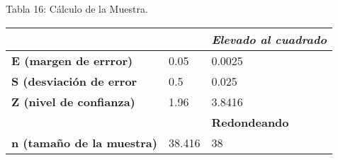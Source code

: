                 \begin{table}[h!]
                    \centering
                    { Tabla 16: Cálculo de la Muestra.}\par
                    \begin{tabular}{|p{5cm}|p{3cm}|p{5cm}|} \hline
                        
                    
                    \textit{{}} &
                    \textit{{}} &
                    \textit{{\bf{Elevado al cuadrado}}} 
                    \\ \hline
    
                    {\bf E (margen de errror)} &
                    0.05 &
                    0.0025
                    \\ \hline

                    {\bf S (desviación de error} &
                    0.5 &
                    0.025
                    \\ \hline

                    {\bf Z (nivel de confianza)} &
                    1.96 &
                    3.8416
                    \\ \hline

                    {} &
                    {} &
                    {\bf Redondeando}
                    \\ \hline

                    {\bf n (tamaño de la muestra)} &
                    38.416 &
                    38
                    \\ \hline   

                    \end{tabular}
                \end{table}                

